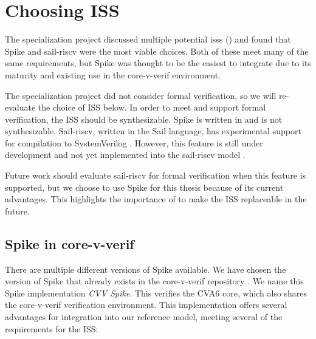 \section{Choosing ISS}

The specialization project discussed multiple potential \acrshort{iss}s () and found that Spike \cite{SpikeRISCVISA2023} and sail-riscv \cite{RISCVSailModel2023} were the most viable choices. Both of these meet many of the same requirements, but Spike was thought to be the easiest to integrate due to its maturity and existing use in the core-v-verif environment. 

The specialization project did not consider formal verification, so we will re-evaluate the choice of ISS below. In order to meet  and support formal verification, the ISS should be synthesizable. Spike is written in \cpp and is not synthesizable. 
Sail-riscv, written in the Sail language, has experimental support for compilation to SystemVerilog \cite{Release17Remsproject2023}. However, this feature is still under development and not yet implemented into the sail-riscv model \cite{SupportSystemVerilogCompilation2024}.

Future work should evaluate sail-riscv for formal verification when this feature is supported, but we choose to use Spike for this thesis because of its current advantages. This highlights the importance of  to make the ISS replaceable in the future.  



\subsection{Spike in core-v-verif}

There are multiple different versions of Spike available. We have chosen the version of Spike that already exists in the core-v-verif repository \cite{openhwgroupOpenhwgroupCorevverif2023}. We name this Spike implementation \textit{CVV Spike}. This verifies the CVA6 core, which also shares the core-v-verif verification environment. This implementation offers several advantages for integration into our reference model, meeting several of the requirements for the ISS:


